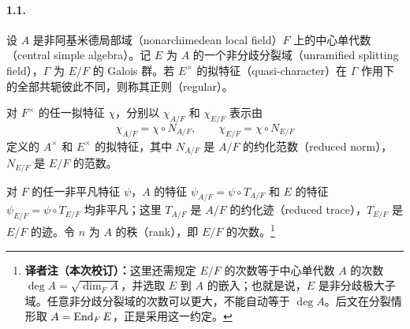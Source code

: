 \paragraph*{1.1.}设 $A$ 是非阿基米德局部域（nonarchimedean local field）$F$ 上的中心单代数（central simple algebra）。记 $E$ 为 $A$ 的一个非分歧分裂域（unramified splitting field），$\Gamma$ 为 $E/F$ 的 Galois 群。若 $E^\times$ 的拟特征（quasi-character）在 $\Gamma$ 作用下的全部共轭彼此不同，则称其正则（regular）。

对 $F^\times$ 的任一拟特征 $\chi$，分别以 $\chi_{A/F}$ 和 $\chi_{E/F}$ 表示由
\[
\chi_{A/F}=\chi\circ N_{A/F},\qquad \chi_{E/F}=\chi\circ N_{E/F}
\]
定义的 $A^\times$ 和 $E^\times$ 的拟特征，其中 $N_{A/F}$ 是 $A/F$ 的约化范数（reduced norm），$N_{E/F}$ 是 $E/F$ 的范数。

对 $F$ 的任一非平凡特征 $\psi$，$A$ 的特征 $\psi_{A/F}=\psi\circ T_{A/F}$ 和 $E$ 的特征 $\psi_{E/F}=\psi\circ T_{E/F}$ 均非平凡；这里 $T_{A/F}$ 是 $A/F$ 的约化迹（reduced trace），$T_{E/F}$ 是 $E/F$ 的迹。令 $n$ 为 $A$ 的秩（rank），即 $E/F$ 的次数。\footnote{\textbf{译者注（本次校订）：}这里还需规定 $E/F$ 的次数等于中心单代数 $A$ 的次数 $\deg A=\sqrt{\dim_F A}$，并选取 $E$ 到 $A$ 的嵌入；也就是说，$E$ 是非分歧极大子域。任意非分歧分裂域的次数可以更大，不能自动等于 $\deg A$。后文在分裂情形取 $A=\operatorname{End}_FE$，正是采用这一约定。}
